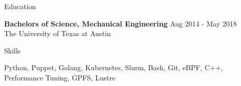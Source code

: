 \documentclass{resume} %
\begin{document}

\begin{rSection}{Education}

{\bf Bachelors of Science, Mechanical Engineering } \hfill { Aug 2014 - May 2018} 
\\{ { The University of Texas at Austin}} 

\end{rSection}

\begin{rSection}{Skills}

Python, Puppet, Golang, Kubernetes, Slurm, Bash, Git, eBPF, C++, Performance
  Tuning, GPFS, Lustre


\end{rSection}
\end{document}
